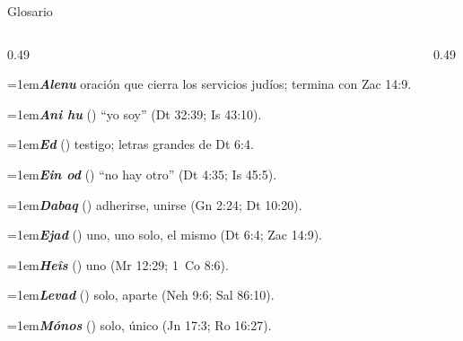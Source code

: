 \begin{frame}{Glosario}
\scriptsize\RaggedRight
\begin{columns}[t,onlytextwidth]
\begin{column}{0.49\textwidth}

\par\noindent\hangindent=1em{\color{azul}\textbf{\emph{Alenu}}} oración que cierra los servicios judíos; termina con Zac 14:9.\par\vspace{2pt}
\par\noindent\hangindent=1em{\color{azul}\textbf{\emph{Ani hu}}} () ``yo soy'' (Dt 32:39; Is 43:10).\par\vspace{2pt}
\par\noindent\hangindent=1em{\color{azul}\textbf{\emph{Ed}}} () testigo; letras grandes de Dt 6:4.\par\vspace{2pt}
\par\noindent\hangindent=1em{\color{azul}\textbf{\emph{Ein od}}} () ``no hay otro'' (Dt 4:35; Is 45:5).\par\vspace{2pt}
\par\noindent\hangindent=1em{\color{azul}\textbf{\emph{Dabaq}}} () adherirse, unirse (Gn 2:24; Dt 10:20).\par\vspace{2pt}
\par\noindent\hangindent=1em{\color{azul}\textbf{\emph{Ejad}}} () uno, uno solo, el mismo (Dt 6:4; Zac 14:9).\par\vspace{2pt}
\par\noindent\hangindent=1em{\color{azul}\textbf{\emph{Heîs}}} () uno (Mr 12:29; 1~Co 8:6).\par\vspace{2pt}
\par\noindent\hangindent=1em{\color{azul}\textbf{\emph{Levad}}} () solo, aparte (Neh 9:6; Sal 86:10).\par\vspace{2pt}
\par\noindent\hangindent=1em{\color{azul}\textbf{\emph{Mónos}}} () solo, único (Jn 17:3; Ro 16:27).\par\vspace{2pt}

\end{column}
\begin{column}{0.49\textwidth}


\end{column}
\end{columns}
\end{frame}
